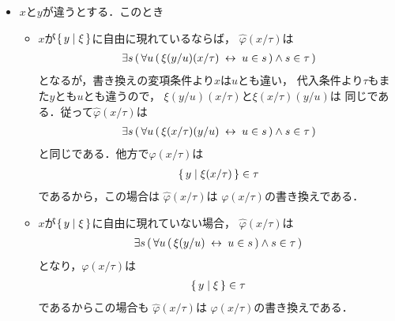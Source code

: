 \begin{metaprf}[第一]
\begin{description}
\begin{description}
\begin{itemize}
							\item $x$と$y$が違うとする．このとき
								\begin{itemize}
									\item $x$が$\{\, y \mid \xi\, \}$に自由に現れているならば，
										$\widehat{\varphi}(x/\tau)$は
										\begin{align}
											\exists s\, (\, \forall u\, (\, \xi(y/u)(x/\tau) \hspace{0.25em}\leftrightarrow\hspace{0.25em} u \in s\, ) \wedge s \in \tau\, )
										\end{align}
										となるが，書き換えの変項条件より$x$は$u$とも違い，
										代入条件より$\tau$もまた$y$とも$u$とも違うので，
										$\xi(y/u)(x/\tau)$と$\xi(x/\tau)(y/u)$は
										同じである．従って$\widehat{\varphi}(x/\tau)$は
										\begin{align}
											\exists s\, (\, \forall u\, (\, \xi(x/\tau)(y/u) \hspace{0.25em}\leftrightarrow\hspace{0.25em} u \in s\, ) \wedge s \in \tau\, )
										\end{align}
										と同じである．他方で$\varphi(x/\tau)$は
										\begin{align}
											\{\, y \mid \xi(x/\tau)\, \} \in \tau
										\end{align}
										であるから，この場合は
										$\widehat{\varphi}(x/\tau)$は
										$\varphi(x/\tau)$の書き換えである．
										
									\item $x$が$\{\, y \mid \xi\, \}$に自由に現れていない場合，
										$\widehat{\varphi}(x/\tau)$は
										\begin{align}
											\exists s\, (\, \forall u\, (\, \xi(y/u) \hspace{0.25em}\leftrightarrow\hspace{0.25em} u \in s\, ) \wedge s \in \tau\, )
										\end{align}
										となり，$\varphi(x/\tau)$は
										\begin{align}
											\{\, y \mid \xi\, \} \in \tau
										\end{align}
										であるからこの場合も
										$\widehat{\varphi}(x/\tau)$は
										$\varphi(x/\tau)$の書き換えである．
								\end{itemize}
						\end{itemize}
					

\end{description}
\end{description}
\end{metaprf}
